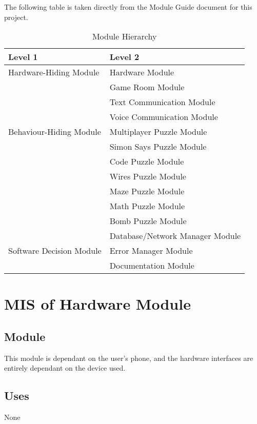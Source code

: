 \documentclass[12pt, titlepage]{article}
\begin{document}
The following table is taken directly from the Module Guide document for this project.

\begin{table}[h!]
\centering
\begin{tabular}{p{} p{}}
\toprule
\textbf{Level 1} & \textbf{Level 2}\\
\midrule

{Hardware-Hiding Module} & Hardware Module \\
\midrule

\multirow{7}{0.3\textwidth}{Behaviour-Hiding Module}
& Game Room Module\\
& Text Communication Module\\
& Voice Communication Module\\
& Multiplayer Puzzle Module\\
& Simon Says Puzzle Module\\
& Code Puzzle Module\\
& Wires Puzzle Module\\
& Maze Puzzle Module\\
& Math Puzzle Module\\
& Bomb Puzzle Module\\
\midrule

\multirow{3}{0.3\textwidth}{Software Decision Module} & Database/Network Manager Module\\
& Error Manager Module\\
& Documentation Module\\
\bottomrule

\end{tabular}
\caption{Module Hierarchy}
\label{TblMH}
\end{table}

\newpage

\section{MIS of {Hardware Module}} \label{HardwareModule} 

\subsection{Module}

This module is dependant on the user's phone, and the hardware interfaces are entirely dependant on the device used. 

\subsection{Uses}
 None
\end{document}
